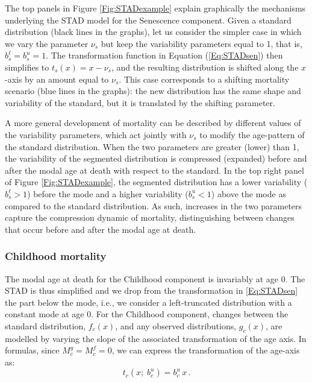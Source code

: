 \documentclass[11pt, a4paper]{article}
\begin{document}
The top panels in Figure \ref{Fig:STADexample} explain graphically the mechanisms underlying the STAD model for the Senescence component. Given a standard distribution (black lines in the graphs), let us consider the simpler case in which we vary the parameter $\nu_{s}$ but keep the variability parameters equal to 1, that is, $b_{s}^{\ell} = b_{s}^{u} = 1$. The transformation function in Equation (\ref{Eq:STADsen}) then simplifies to $t_{s}(x) = x - \nu_{s}$, and the resulting distribution is shifted along the $x$-axis by an amount equal to $\nu_{s}$. This case corresponds to a shifting mortality scenario (blue lines in the graphs): the new distribution has the same shape and variability of the standard, but it is  translated by the shifting parameter.

A more general development of mortality can be described by different values of the variability parameters, which act jointly with $\nu_{s}$ to modify the age-pattern of the standard distribution. When the two parameters are greater (lower) than 1, the variability of the segmented distribution is compressed (expanded) before and after the modal age at death with respect to the standard. In the top right panel of Figure \ref{Fig:STADexample}, the segmented distribution has a lower variability ($b_{s}^{\ell} > 1$) before the mode and a higher variability ($b_{s}^{u} < 1$) above the mode as compared to the standard distribution. As such, increases in the two parameters capture the compression dynamic of mortality, distinguishing between changes that occur before and after the modal age at death.

\subsubsection{Childhood mortality}

The modal age at death for the Childhood component is invariably at age 0. The STAD is thus simplified and we drop from the transformation in \eqref{Eq:STADsen} the part below the mode, i.e., we consider a left-truncated distribution with a constant mode at age 0. For the Childhood component, changes between the standard distribution, $f_{c}(x)$, and any observed distributions, $g_{c}(x)$, are modelled by varying the slope of the associated transformation of the age axis. In formulas, since $M_{c}^{g} = M_{c}^{f} = 0$, we can express the transformation of the age-axis as:
\begin{equation}\label{Eq:STADchil}
t_{c}(x;\;b_{c}^{u}) =  b_{c}^{u} \, x \,.
\end{equation}
\end{document}

